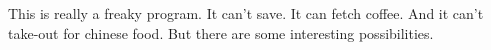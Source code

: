 This is really a freaky program. It can't save. It can fetch coffee. And it can't take-out for chinese food. But there are some interesting possibilities. 